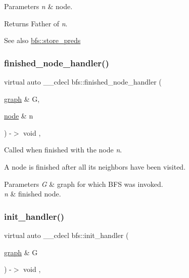 \begin{DoxyParams}{Parameters}
{\em n} & node. \\
\hline
\end{DoxyParams}
\begin{DoxyReturn}{Returns}
Father of {\itshape n}. 
\end{DoxyReturn}
\begin{DoxySeeAlso}{See also}
\mbox{\hyperlink{classbfs_aa7200a3b11a17b8c87675b1a9bc010aa}{bfs\+::store\+\_\+preds}} 
\end{DoxySeeAlso}
\mbox{\label{classbfs_a4543e9eb32673c20271baea923340ab3}} 
\subsubsection{\texorpdfstring{finished\+\_\+node\+\_\+handler()}{finished\_node\_handler()}}
{\footnotesize\ttfamily virtual auto \+\_\+\+\_\+cdecl bfs\+::finished\+\_\+node\+\_\+handler (\begin{DoxyParamCaption}\item[{\mbox{\hyperlink{classgraph}{graph}} \&}]{G,  }\item[{\mbox{\hyperlink{classnode}{node}} \&}]{n }\end{DoxyParamCaption}) -\/$>$ void \hspace{0.3cm}{\ttfamily [inline]}, {\ttfamily [virtual]}}



Called when finished with the node {\itshape n}. 

A node is finished after all its neighbors have been visited.


\begin{DoxyParams}{Parameters}
{\em G} & graph for which B\+FS was invoked. \\
\hline
{\em n} & finished node. \\
\hline
\end{DoxyParams}
\mbox{\label{classbfs_a5f6e0f575ee3d851ffbb24bdda90ed85}} 
\subsubsection{\texorpdfstring{init\+\_\+handler()}{init\_handler()}}
{\footnotesize\ttfamily virtual auto \+\_\+\+\_\+cdecl bfs\+::init\+\_\+handler (\begin{DoxyParamCaption}\item[{\mbox{\hyperlink{classgraph}{graph}} \&}]{G }\end{DoxyParamCaption}) -\/$>$ void \hspace{0.3cm}{\ttfamily [inline]}, {\ttfamily [virtual]}}



